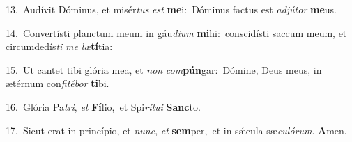 {\numbfont\textcolor{\numbcolor}{13.}}~Audívit Dóminus, et misér\textit{tus} \textit{est} \textbf{me}\-i:~\star Dóminus factus est \textit{ad}\-\textit{jú}\textit{tor} \textbf{me}\-us.\par
{\numbfont\textcolor{\numbcolor}{14.}}~Convertísti planctum meum in gáu\-\textit{di}\-\textit{um} \textbf{mi}\-hi:~\star conscidísti saccum meum, et circumdedís\textit{ti} \textit{me} \textit{læ}\-\textbf{tí}tia:\par
{\numbfont\textcolor{\numbcolor}{15.}}~Ut cantet tibi glória mea, et \textit{non} \textit{com}\-\textbf{pún}gar:~\star Dómine, Deus meus, in ætérnum con\-\textit{fi}\-\textit{té}\textit{bor} \textbf{ti}\-bi.\par
{\numbfont\textcolor{\numbcolor}{16.}}~Glória Pa\-\textit{tri}\-, \textit{et} \textbf{Fí}\-lio,~\star et Spi\-\textit{rí}\-\textit{tu}\textit{i} \textbf{Sanc}\-to.\par
{\numbfont\textcolor{\numbcolor}{17.}}~Sicut erat in princípio, et \textit{nunc}\-, \textit{et} \textbf{sem}\-per,~\star et in sǽcula sæ\-\textit{cu}\-\textit{ló}\textit{rum}. \textbf{A}\-men.\par
